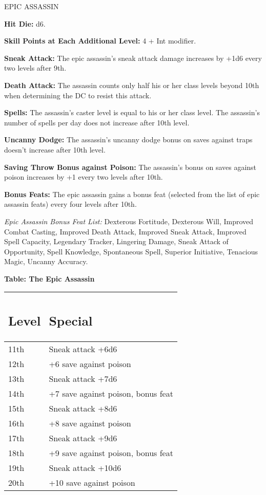 \documentclass{article}
\begin{document}
\vspace{24pt}
{\LARGE{}EPIC ASSASSIN }

\textbf{Hit Die:} d6. 

\textbf{Skill Points at Each Additional Level:} 4 + Int modifier. 

\textbf{Sneak Attack:} The epic assassin's sneak attack damage increases by +1d6 
every two levels after 9th. 

\textbf{Death Attack:} The assassin counts only half his or her class levels beyond 
10th when determining the DC to resist this attack. 

\textbf{Spells:} The assassin's caster level is equal to his or her class level. 
The assassin's number of spells per day does not increase after 10th level. 

\textbf{Uncanny Dodge:} The assassin's uncanny dodge bonus on saves against traps 
doesn't increase after 10th level. 

\textbf{Saving Throw Bonus against Poison:} The assassin's bonus on saves against 
poison increases by +1 every two levels after 10th. 

\textbf{Bonus Feats:} The epic assassin gains a bonus feat (selected from the list 
of epic assassin feats) every four levels after 10th. 

\textit{Epic Assassin Bonus Feat List: }Dexterous Fortitude, Dexterous Will, Improved 
Combat Casting, Improved Death Attack, Improved Sneak Attack, Improved Spell Capacity, 
Legendary Tracker, Lingering Damage, Sneak Attack of Opportunity, Spell Knowledge, 
Spontaneous Spell, Superior Initiative, Tenacious Magic, Uncanny Accuracy. 

\textbf{Table: The Epic Assassin }

\begin{tabular}{|>{\raggedright}p{27pt}|>{\raggedright}p{143pt}|}
\hline
\subsection*{L\textbf{evel}} & \subsection*{S\textbf{pecial }}\tabularnewline
\hline
11th & Sneak attack +6d6 \tabularnewline
\hline
12th & +6 save against poison \tabularnewline
\hline
13th & Sneak attack +7d6 \tabularnewline
\hline
14th & +7 save against poison, bonus feat \tabularnewline
\hline
15th & Sneak attack +8d6 \tabularnewline
\hline
16th & +8 save against poison \tabularnewline
\hline
17th & Sneak attack +9d6 \tabularnewline
\hline
18th & +9 save against poison, bonus feat \tabularnewline
\hline
19th & Sneak attack +10d6 \tabularnewline
\hline
20th & +10 save against poison\tabularnewline
\hline
\end{tabular}
\end{document}
